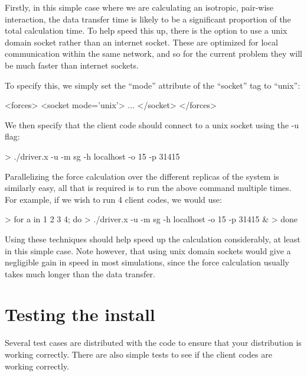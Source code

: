 \documentclass[11pt,english,fleqn]{report}
\newenvironment{code}{%
\footnotesize 
\verbatim
}{
\endverbatim
\normalsize
}
\begin{document}
Firstly, in this simple case where we are calculating an isotropic,
pair-wise interaction, the data transfer time is likely to be a
significant proportion of the total calculation time. To help speed this
up, there is the option to use a unix domain socket rather than an
internet socket. These are optimized for local communication within
the same network, and so for the current problem they will be much
faster than internet sockets.

To specify this, we simply set the {}``mode'' attribute of the
{}``socket'' tag to {}``unix'':

\begin{code}
<forces>
   <socket mode='unix'>
      ...
   </socket>
</forces>
\end{code}

We then specify that the client code should connect to a unix socket
using the -u flag:

\begin{code}
> ./driver.x -u -m sg -h localhost -o 15 -p 31415
\end{code}

Parallelizing the force calculation over the different replicas of the system
is similarly easy, all that is required is to run the above
command multiple times. For example, if we wish to run
4 client codes, we would use:

\begin{code}
> for a in 1 2 3 4; do
>    ./driver.x -u -m sg -h localhost -o 15 -p 31415 &
> done
\end{code}

Using these techniques should help speed up the calculation considerably,
at least in this simple case. Note however, that using unix domain sockets
would give a negligible gain in speed in most simulations, 
since the force calculation usually takes much longer than the data transfer. 

\section{Testing the install}

\label{tests}

Several test cases are distributed with the code to ensure that your
distribution is working correctly. There are also simple tests to
see if the client codes are working correctly.
\end{document}
